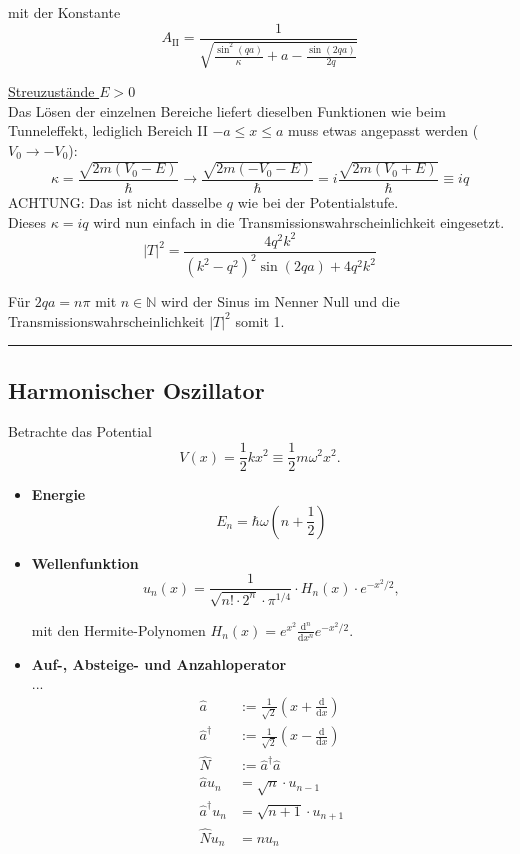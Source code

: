 \documentclass{article}
\newcommand{\diff}{\mathrm{d}}
\newcommand{\lr}[1]{\left(#1\right)}
\begin{document}
{mit der Konstante
	$$A_\text{II} = \frac{1}{\sqrt{\frac{\sin^2(qa)}{\kappa} + a - \frac{\sin(2qa)}{2q}}}$$
	
	\underline{Streuzustände $E>0$}\\
	Das Lösen der einzelnen Bereiche liefert dieselben Funktionen wie beim Tunneleffekt, lediglich Bereich II $-a\leq x\leq a$ muss etwas angepasst werden ($V_0\rightarrow -V_0$):
		$$\kappa = \frac{\sqrt{2m(V_0-E)}}{\hbar} \rightarrow \frac{\sqrt{2m(-V_0-E)}}{\hbar} = i\frac{\sqrt{2m(V_0+E)}}{\hbar} \equiv iq$$
	\textcolor{gruen}{ACHTUNG: Das ist nicht dasselbe $q$ wie bei der Potentialstufe.}\\
	Dieses $\kappa = iq$ wird nun einfach in die Transmissionswahrscheinlichkeit eingesetzt.
		$$|T|^2 = \frac{4q^2k^2}{(k^2-q^2)^2\sin(2qa) + 4q^2k^2}$$
	
	Für $2qa = n\pi$ mit $n\in\mathbb{N}$ wird der Sinus im Nenner Null und die Transmissionswahrscheinlichkeit  $|T|^2$ somit 1.
\hrule
}


\newpage


\subsection{Harmonischer Oszillator}
Betrachte das Potential
	\begin{equation}
		V(x) = \frac{1}{2}k x^2 \equiv \frac{1}{2} m \omega^2 x^2.
	\end{equation}


	\begin{itemize}
		\item \textbf{Energie}
			\begin{equation}
				E_n = \hbar\omega \lr{n + \frac{1}{2}}
			\end{equation}


		\item \textbf{Wellenfunktion}
			\begin{equation}
				u_n(x) = \frac{1}{\sqrt{n! \cdot 2^n} \cdot \pi^{1/4}} \cdot H_n(x) \cdot e^{-x^2/2},
			\end{equation}
		
		mit den Hermite-Polynomen $H_n(x) = e^{x^2} \frac{\diff^n}{\diff x^n} e^{-x^2/2}$.
		
		
		\item \textbf{Auf-, Absteige- und Anzahloperator}\\
		...
			\begin{align}
				\hat{a} &:= \frac{1}{\sqrt{2}}\lr{x + \frac{\diff}{\diff x}} \\
				\hat{a}^\dagger &:= \frac{1}{\sqrt{2}}\lr{x - \frac{\diff}{\diff x}} \\
				\hat{N} &:= \hat{a}^\dagger\hat{a} \\
				\hat{a} u_n &= \sqrt{n} \cdot u_{n-1} \\
				\hat{a}^\dagger u_n &= \sqrt{n+1} \cdot u_{n+1} \\
				\hat{N} u_n &= n u_n
			\end{align}
	\end{itemize}
\end{document}
